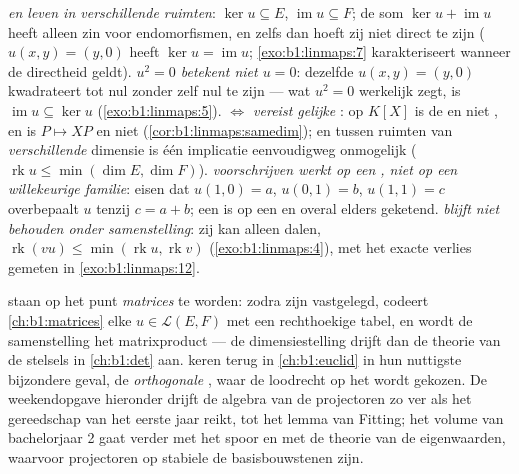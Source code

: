 \begin{remark}
\label{rem:b1:linmaps:pitfalls}
\emph{ en  leven in verschillende ruimten}: $\ker u
\subseteq E$, $\operatorname{im} u \subseteq F$; de som $\ker u +
\operatorname{im} u$ heeft alleen zin voor endomorfismen, en zelfs
dan hoeft zij niet direct te zijn ($u(x, y) = (y, 0)$ heeft $\ker
u = \operatorname{im} u$; \cref{exo:b1:linmaps:7} karakteriseert
wanneer de directheid geldt).
\emph{$u^2 = 0$ betekent niet $u = 0$}: dezelfde $u(x,y) = (y, 0)$
kwadrateert tot nul zonder zelf nul te zijn --- wat $u^2 = 0$
werkelijk zegt, is $\operatorname{im} u \subseteq \ker u$
(\cref{exo:b1:linmaps:5}).
\emph{ $\iff$  vereist gelijke }: op $K[X]$ is de   en niet
, en is $P \mapsto XP$  en niet 
(\cref{cor:b1:linmaps:samedim}); en tussen ruimten van
\emph{verschillende} dimensie is één implicatie eenvoudigweg
onmogelijk ($\operatorname{rk} u \leq \min(\dim E, \dim F)$).
\emph{ voorschrijven werkt op een , niet op een
willekeurige familie}: eisen dat $u(1, 0) = a$, $u(0, 1) = b$,
$u(1, 1) = c$ overbepaalt $u$ tenzij $c = a + b$; een  is  op een  en overal elders geketend.
\emph{ blijft niet behouden onder samenstelling}: zij kan
alleen dalen, $\operatorname{rk}(vu) \leq \min(\operatorname{rk}
u, \operatorname{rk} v)$ (\cref{exo:b1:linmaps:4}), met het exacte
verlies gemeten in \cref{exo:b1:linmaps:12}.
\end{remark}

\begin{remark}
\label{rem:b1:linmaps:whereused}
 staan op het punt \emph{matrices} te
worden: zodra  zijn vastgelegd, codeert \cref{ch:b1:matrices}
elke $u \in \mathcal{L}(E, F)$ met een rechthoekige tabel, en
wordt de samenstelling het matrixproduct --- de dimensiestelling
drijft dan de theorie van de  stelsels in
\cref{ch:b1:det} aan.  keren terug in
\cref{ch:b1:euclid} in hun nuttigste bijzondere geval, de
\emph{orthogonale} , waar de  loodrecht op het 
wordt gekozen. De weekendopgave hieronder drijft de algebra van de
projectoren zo ver als het gereedschap van het eerste jaar reikt,
tot het lemma van Fitting; het volume van bachelorjaar 2 gaat
verder met het spoor en met de theorie van de eigenwaarden,
waarvoor projectoren op stabiele  de basisbouwstenen
zijn.
\end{remark}


